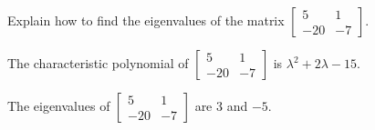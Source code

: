 
\begin{exerciseStatement}


Explain how to find the eigenvalues of the matrix \( \left[\begin{array}{cc}
5 & 1 \\
-20 & -7
\end{array}\right] \).


\end{exerciseStatement}
    
\begin{exerciseAnswer} 


The characteristic polynomial of \( \left[\begin{array}{cc}
5 & 1 \\
-20 & -7
\end{array}\right] \) is \( \lambda^{2} + 2 \lambda - 15 \).



The eigenvalues of \( \left[\begin{array}{cc}
5 & 1 \\
-20 & -7
\end{array}\right] \) are \( 3 \) and \( -5 \).


\end{exerciseAnswer}
    
